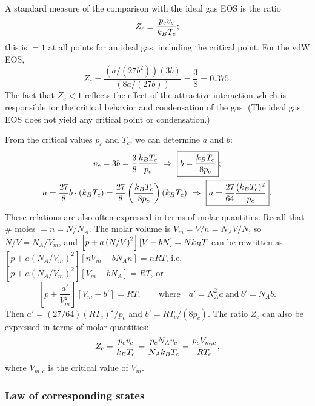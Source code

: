 A standard measure of the comparison with the ideal gas EOS is the ratio
\begin{equation}
  Z_c\equiv\frac{p_cv_c}{k_{B} T_c};
\end{equation}
this is $=1$ at all points for an ideal gas, including the critical point. For the vdW EOS,
\begin{equation}
  Z_c = \frac{\left(a/(27b^2)\right)(3b)}{\left(8a/(27b)\right)} = \frac{3}{8} = 0.375 .
\end{equation}
The fact that $Z_c<1$ reflects the effect of the attractive interaction which is responsible for the critical
behavior and condensation of the gas. (The ideal gas EOS does not yield any critical point or condensation.)

From the critical values $p_c$ and $T_c$, we can determine $a$ and $b$:
\begin{gather}
  v_c = 3b = \frac{3}{8}\frac{k_{B} T_c}{p_c}\ \Rightarrow\ \boxed{b = \frac{k_{B} T_c}{8p_c}};\nonumber\\
  a = \frac{27}{8}b\cdot(k_{B} T_c) = \frac{27}{8}\left(\frac{k_{B} T_c}{8p_c}\right)(k_{B} T_c)
  \ \Rightarrow\ \boxed{a = \frac{27}{64}\frac{(k_{B} T_c)^2}{p_c}}.
\end{gather}
These relations are also often expressed in terms of molar quantities. Recall that \# moles $= n = N/N_A$. The
molar volume is $V_m = V/n = N_AV/N$, so $N/V = N_A/V_m$, and
$\left[p + a\left(N/V\right)^2\right][V - bN] = Nk_{B} T$ can be rewritten as
$\left[p + a\left(N_A/V_m\right)^2\right][nV_m - bN_An] = nRT$, i.e.\ $\left[p + a\left(N_A/V_m\right)^2\right][V_m - bN_A] = RT$, or
\begin{equation}
  \left[p + \frac{a'}{V_m^2}\right]\left[V_m - b'\right] = RT,\qquad\text{where}\quad a' = N_A^2a\ \text{and}\ b' = N_Ab .
\end{equation}
Then $a' = (27/64)(RT_c)^2/p_c$ and $b' = RT_c/(8p_c)$. The ratio $Z_c$ can also be expressed
in terms of molar quantities:
\begin{equation}
  Z_c = \frac{p_cv_c}{k_{B} T_c} = \frac{p_cN_Av_c}{N_Ak_{B} T_c} = \frac{p_cV_{m,c}}{RT_c},
\end{equation}
where $V_{m,c}$ is the critical value of $V_m$.

\subsubsection*{Law of corresponding states}

